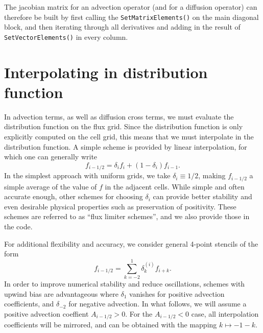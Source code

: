 \documentclass{notes}
\begin{document}
    The jacobian matrix for an advection operator (and for a diffusion operator)
    can therefore be built by first calling the \texttt{SetMatrixElements()} on
    the main diagonal block, and then iterating through all derivatives and
    adding in the result of \texttt{SetVectorElements()} in every column.

    \section{Interpolating in distribution function}\label{sec:interp}
    In advection terms, as well as diffusion cross terms, we must evaluate the
    distribution function on the flux grid. Since the distribution function is
    only explicitly computed on the cell grid, this means that we must
    interpolate in the distribution function. A simple scheme is provided by 
    linear interpolation, for which one can generally write
    \begin{equation}
        f_{i-1/2} = \delta_{i} f_i + \left( 1 - \delta_i \right) f_{i-1}.
    \end{equation}
    In the simplest approach with uniform grids, we take $\delta_i\equiv 1/2$, making $f_{i-1/2}$
    a simple average of the value of $f$ in the adjacent cells. While simple and
    often accurate enough, other schemes for choosing $\delta_i$ can provide
    better stability and even desirable physical properties such as preservation
    of positivity. These schemes are referred to as ``flux limiter schemes'',
    and we also provide those in the code.
    
    For additional flexibility and accuracy, we consider general 4-point stencils of the form
    \begin{equation}
    	f_{i-1/2} = \sum_{k=-2}^1 \delta^{(i)}_k f_{i+k}.
    \end{equation}
    In order to improve numerical stability and reduce oscillations, schemes with 
    upwind bias are advantageous where $\delta_{1}$ vanishes for positive 
    advection coefficients, and $\delta_{-2}$ for negative advection. In what follows,
    we will assume a positive advection coeffient $A_{i-1/2}>0$. For the $A_{i-1/2}<0$ 
    case, all interpolation coefficients will be mirrored, and can be obtained with the 
    mapping $k \mapsto -1 - k$.
    
\end{document}
